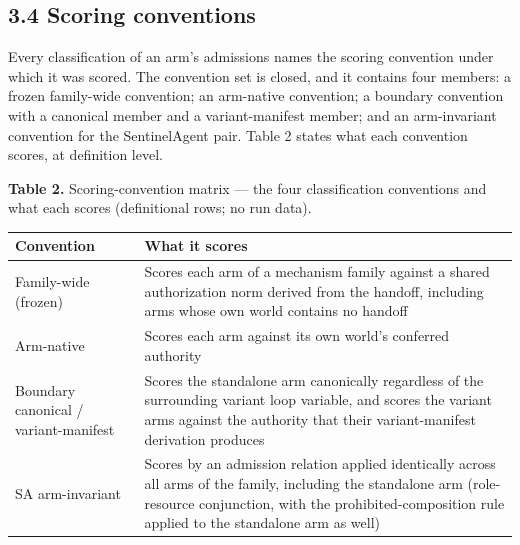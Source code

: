 \documentclass[
  10pt,
]{article}
\newcounter{none} %
\renewcommand{\_}{\origunderscore\allowbreak}
\begin{document}
\subsection{3.4 Scoring conventions}\label{scoring-conventions}

Every classification of an arm's admissions names the scoring convention
under which it was scored. The convention set is closed, and it contains
four members: a frozen family-wide convention; an arm-native convention;
a boundary convention with a canonical member and a variant-manifest
member; and an arm-invariant convention for the SentinelAgent pair.
Table 2 states what each convention scores, at definition level.

\textbf{Table 2.} Scoring-convention matrix --- the four classification
conventions and what each scores (definitional rows; no run data).

{\def\LTcaptype{none} %
\begin{longtable}[]{@{}
  >{\raggedright\arraybackslash}p{}
  >{\raggedright\arraybackslash}p{}@{}}
\toprule\noalign{}
\begin{minipage}[b]{\linewidth}\raggedright
Convention
\end{minipage} & \begin{minipage}[b]{\linewidth}\raggedright
What it scores
\end{minipage} \\
\midrule\noalign{}
\endhead
\bottomrule\noalign{}
\endlastfoot
Family-wide (frozen) & Scores each arm of a mechanism family against a
shared authorization norm derived from the handoff, including arms whose
own world contains no handoff \\
Arm-native & Scores each arm against its own world's conferred
authority \\
Boundary canonical / variant-manifest & Scores the standalone arm
canonically regardless of the surrounding variant loop variable, and
scores the variant arms against the authority that their
variant-manifest derivation produces \\
SA arm-invariant & Scores by an admission relation applied identically
across all arms of the family, including the standalone arm
(role-resource conjunction, with the prohibited-composition rule applied
to the standalone arm as well) \\
\end{longtable}
}
\end{document}
